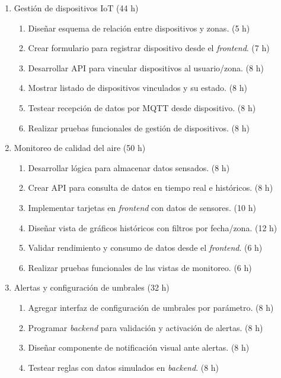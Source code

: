\documentclass[
11pt, %
]{charter}
\begin{document}
\begin{enumerate}
    \item Gestión de dispositivos IoT (44 h)
    \begin{enumerate}
        \item Diseñar esquema de relación entre dispositivos y zonas. (5 h)
        \item Crear formulario para registrar dispositivo desde el \textit{frontend}. (7 h)
        \item Desarrollar API para vincular dispositivos al usuario/zona. (8 h)
        \item Mostrar listado de dispositivos vinculados y su estado. (8 h)
        \item Testear recepción de datos por MQTT desde dispositivo. (8 h)
        \item Realizar pruebas funcionales de gestión de dispositivos. (8 h)
    \end{enumerate}

    \item Monitoreo de calidad del aire (50 h)
    \begin{enumerate}
        \item Desarrollar lógica para almacenar datos sensados. (8 h)
        \item Crear API para consulta de datos en tiempo real e históricos. (8 h)
        \item Implementar tarjetas en \textit{frontend} con datos de sensores. (10 h)
        \item Diseñar vista de gráficos históricos con filtros por fecha/zona. (12 h)
        \item Validar rendimiento y consumo de datos desde el \textit{frontend}. (6 h)
        \item Realizar pruebas funcionales de las vistas de monitoreo. (6 h)
    \end{enumerate}

    \item Alertas y configuración de umbrales (32 h)
    \begin{enumerate}
        \item Agregar interfaz de configuración de umbrales por parámetro. (8 h)
        \item Programar \textit{backend} para validación y activación de alertas. (8 h)
        \item Diseñar componente de notificación visual ante alertas. (8 h)
        \item Testear reglas con datos simulados en \textit{backend}. (8 h)
    \end{enumerate}


\end{enumerate}
\end{document}
